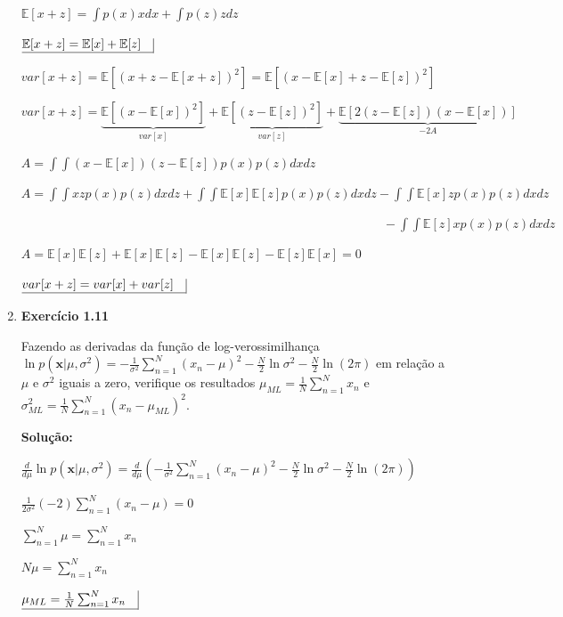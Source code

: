 \begin{enumerate}
$ \mathbb{E}[x+z] = \displaystyle \int p(x) x dx  +  \int p(z) z dz $

$ \underline{\mathbb{E}[x+z] = \mathbb{E}[x]  +  \mathbb{E}[z] \quad} \vline $

$ var[x+z] = \mathbb{E}[(x+z-\mathbb{E}[x+z])^2] = \mathbb{E}[(x-\mathbb{E}[x]+z-\mathbb{E}[z])^2]$

$ var[x+z] = \underbrace{\mathbb{E}[(x-\mathbb{E}[x])^2]}_{var[x]}+\underbrace{\mathbb{E}[(z-\mathbb{E}[z])^2]}_{var[z]}+\underbrace{\mathbb{E}[2(z-\mathbb{E}[z])(x-\mathbb{E}[x])]}_{-2A}$

$A = \displaystyle \int \int (x-\mathbb{E}[x]) (z-\mathbb{E}[z]) p(x)p(z) dx dz$

$A = \displaystyle \int \int xz p(x)p(z) dx dz + \int \int \mathbb{E}[x] \mathbb{E}[z] p(x)p(z) dx dz - \int \int \mathbb{E}[x] z p(x)p(z) dx dz $

$ \quad \quad \quad \quad \quad \quad \quad \quad \quad \quad \quad \quad  \quad \quad \quad \quad \quad \quad \quad \quad \quad \quad \quad \quad  \quad \quad \quad \quad \quad\displaystyle  - \int \int \mathbb{E}[z] x p(x)p(z) dx dz$

$A=\mathbb{E}[x]\mathbb{E}[z]+\mathbb{E}[x]\mathbb{E}[z]-\mathbb{E}[x]\mathbb{E}[z]-\mathbb{E}[z]\mathbb{E}[x]=0$

$ \underline{var[x+z]=var[x]+var[z] \quad} \vline $
    

\item \textbf{Exercício 1.11} \par

Fazendo as derivadas da função de log-verossimilhança $\ln p (\boldsymbol{x}|\mu, \sigma^2) = -\frac{1}{\sigma^2}\sum_{n=1}^{N}(x_n-\mu)^2-\frac{N}{2}\ln \sigma^2 - \frac{N}{2}\ln (2\pi)$ em relação a $\mu$ e $\sigma^2$ iguais a zero, verifique os resultados $\mu_{ML}=\frac{1}{N}\sum_{n=1}^{N}x_n$ e $\sigma_{ML}^2=\frac{1}{N}\sum_{n=1}^{N}(x_n-\mu_{ML})^2$.
\newline \par
\textbf{Solução:}

$\frac{d}{d\mu}\ln p (\boldsymbol{x}|\mu, \sigma^2) = \frac{d}{d\mu}\left( -\frac{1}{\sigma^2}\sum_{n=1}^{N}(x_n-\mu)^2-\frac{N}{2}\ln \sigma^2 - \frac{N}{2}\ln (2\pi) \right)$

$\frac{1}{2\sigma^2}(-2)\sum_{n=1}^{N}(x_n-\mu) = 0$

$\sum_{n=1}^{N}\mu = \sum_{n=1}^{N}x_n$

$N\mu = \sum_{n=1}^{N}x_n$

$ \underline{\mu_{ML} = \frac{1}{N} \sum_{n=1}^{N}x_n \quad} \vline $



\end{enumerate}
